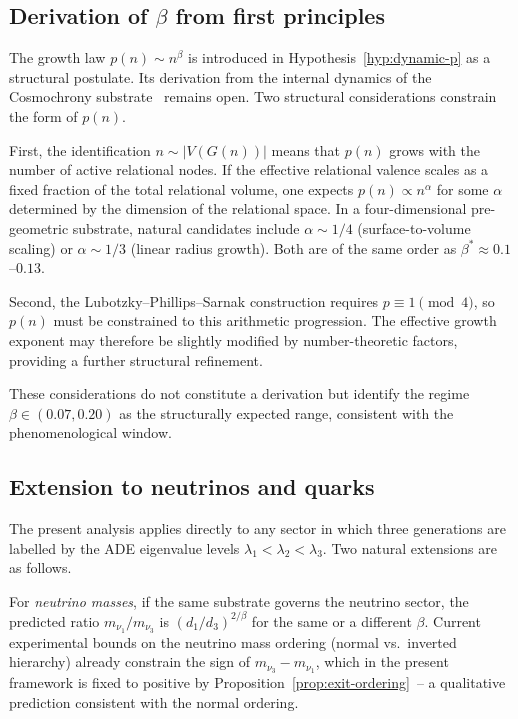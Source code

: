\documentclass[11pt,a4paper]{article}
\begin{document}
    \subsection{Derivation of $\beta$ from first principles}
      \label{subsec:beta-derivation}

      The growth law $p(n) \sim n^\beta$ is introduced in
      Hypothesis~\ref{hyp:dynamic-p} as a structural postulate.
      Its derivation from the internal dynamics of the Cosmochrony
      substrate~\cite{Cosmochrony} remains open.
      Two structural considerations constrain the form of $p(n)$.

      First, the identification $n \sim |V(G(n))|$ means that
      $p(n)$ grows with the number of active relational nodes.
      If the effective relational valence scales as a fixed fraction of
      the total relational volume, one expects $p(n) \propto n^{\alpha}$
      for some $\alpha$ determined by the dimension of the relational space.
      In a four-dimensional pre-geometric substrate, natural candidates
      include $\alpha \sim 1/4$ (surface-to-volume scaling)
      or $\alpha \sim 1/3$ (linear radius growth).
      Both are of the same order as $\beta^* \approx 0.1$--$0.13$.

      Second, the Lubotzky--Phillips--Sarnak construction requires
      $p \equiv 1 \pmod{4}$, so $p(n)$ must be constrained to this
      arithmetic progression.
      The effective growth exponent may therefore be slightly modified by
      number-theoretic factors, providing a further structural refinement.

      These considerations do not constitute a derivation but identify
      the regime $\beta \in (0.07, 0.20)$ as the structurally
      expected range, consistent with the phenomenological window.

    \subsection{Extension to neutrinos and quarks}
      \label{subsec:extensions}

      The present analysis applies directly to any sector in which three
      generations are labelled by the ADE eigenvalue levels
      $\lambda_1 < \lambda_2 < \lambda_3$.
      Two natural extensions are as follows.

      For \emph{neutrino masses}, if the same substrate governs the
      neutrino sector, the predicted ratio $m_{\nu_1}/m_{\nu_3}$
      is $(d_1/d_3)^{2/\beta}$ for the same or a different $\beta$.
      Current experimental bounds on the neutrino mass ordering
      (normal vs.\ inverted hierarchy) already constrain the sign of
      $m_{\nu_3} - m_{\nu_1}$, which in the present framework
      is fixed to positive by Proposition~\ref{prop:exit-ordering}~--
      a qualitative prediction consistent with the normal ordering.
\end{document}
